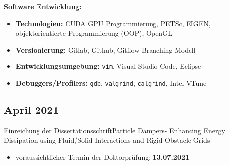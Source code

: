 \documentclass{mycv}
\begin{document}
\begin{paracol}{2}
	 {\bfseries Software Entwicklung:}\par
	 \begin{itemize}
		 \item {\bfseries Technologien:} CUDA GPU Programmierung, PETSc, EIGEN,
			 \,objektorientierte Programmierung (OOP), OpenGL\par
		 \item {\bfseries Versionierung:} Gitlab, Github, Gitflow
			 Branching-Modell\par
		 \item {\bfseries Entwicklungsumgebung:} \verb|vim|, Visual-Studio Code,
			 Eclipse \par
		 \item {\bfseries Debuggers/Profilers:} \verb|gdb|, \verb|valgrind|, \verb|calgrind|,
			 Intel VTune\\
	 \end{itemize}


		
\subsection{April 2021}{Einreichung der Dissertationsschrift}{Particle Dampers-
Enhancing Energy Dissipation using Fluid/Solid Interactions and Rigid
Obstacle-Grids}
	  \begin{itemize}
			\item voraussichtlicher Termin der Doktorpr{\"u}fung:
				{\bfseries 13.07.2021}
		\end{itemize}
		\flushpage
\end{paracol}
\end{document}
